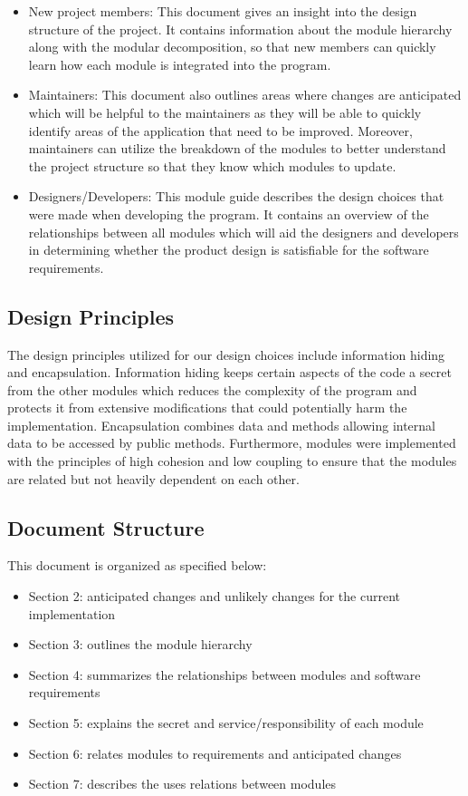 \documentclass[12pt, titlepage]{article}
\begin{document}
\begin{itemize}
	\item New project members: This document gives an insight into the design structure of the project. It contains information about the module hierarchy along with the modular decomposition, so that new members can quickly learn how each module is integrated into the program.
	\item Maintainers: This document also outlines areas where changes are anticipated which will be helpful to the maintainers as they will be able to quickly identify areas of the application that need to be improved. Moreover, maintainers can utilize the breakdown of the modules to better understand the project structure so that they know which modules to update.
	\item Designers/Developers: This module guide describes the design choices that were made when developing the program. It contains an overview of the relationships between all modules which will aid the designers and developers in determining whether the product design is satisfiable for the software requirements.
\end{itemize}

\subsection{Design Principles}
The design principles utilized for our design choices include information hiding and encapsulation. Information hiding keeps certain aspects of the code a secret from the other modules which reduces the complexity of the program and protects it from extensive modifications that could potentially harm the implementation. Encapsulation combines data and methods allowing internal data to be accessed by public methods. Furthermore, modules were implemented with the principles of high cohesion and low coupling to ensure that the modules are related but not heavily dependent on each other.

\subsection{Document Structure}
This document is organized as specified below:
\begin{itemize}
	\item Section 2: anticipated changes and unlikely changes for the current implementation
	\item Section 3: outlines the module hierarchy 
	\item Section 4: summarizes the relationships between modules and software requirements
	\item Section 5: explains the secret and service/responsibility of each module
	\item Section 6: relates modules to requirements and anticipated changes 
	\item Section 7: describes the uses relations between modules
\end{itemize}
\end{document}
